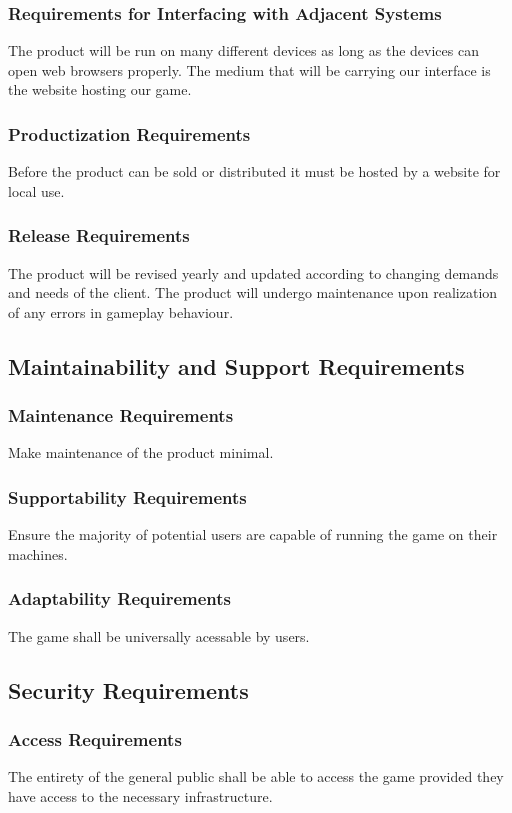 \documentclass[11pt, oneside]{article}   	%
\begin{document}
\subsubsection{Requirements for Interfacing with Adjacent Systems}
The product will be run on many different devices as long as the devices can open web browsers properly. The medium that will be carrying our interface is the website hosting our game.


\subsubsection{Productization Requirements}
Before the product can be sold or distributed it must be hosted by a website for local use.

\subsubsection{Release Requirements}
The product will be revised yearly and updated according to changing demands and needs of the client. The product will undergo maintenance upon realization of any errors in gameplay behaviour.


\subsection{Maintainability and Support Requirements}
\subsubsection{Maintenance Requirements}
Make maintenance of the product minimal.


\subsubsection{Supportability Requirements}
Ensure the majority of potential users are capable of running the game on their machines.


\subsubsection{Adaptability Requirements}
The game shall be universally acessable by users.


\subsection{Security Requirements}
\subsubsection{Access Requirements}
The entirety of the general public shall be able to access the game provided they have access to the necessary infrastructure.
\end{document}
